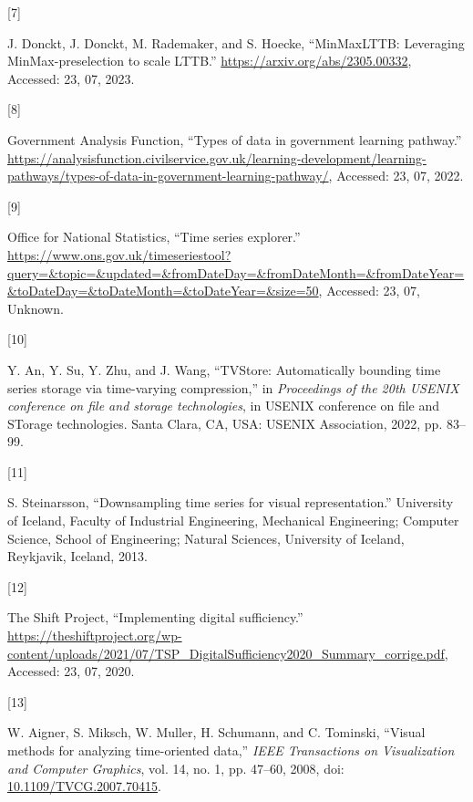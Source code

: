 \documentclass{article}
\newlength{\cslhangindent}
\newlength{\csllabelwidth}
\newlength{\cslentryspacingunit} %
\newenvironment{CSLReferences}[2] %
 {%
  \setlength{\parindent}{0pt}
  \ifodd #1
  \let\oldpar\par
  \def\par{\hangindent=\cslhangindent\oldpar}
  \fi
  \setlength{\parskip}{#2\cslentryspacingunit}
 }%
 {}
\newcommand{\CSLLeftMargin}[1]{\parbox[t]{\csllabelwidth}{#1}}
\newcommand{\CSLRightInline}[1]{\parbox[t]{\linewidth - \csllabelwidth}{#1}\break}
\begin{document}
\begin{CSLReferences}{0}{0}
\leavevmode{}%
\CSLLeftMargin{{[}7{]} }
\CSLRightInline{J. Donckt, J. Donckt, M. Rademaker, and S. Hoecke,
{``MinMaxLTTB: Leveraging MinMax-preselection to scale LTTB.''}
\url{https://arxiv.org/abs/2305.00332}, Accessed: 23, 07, 2023.}

\leavevmode{}%
\CSLLeftMargin{{[}8{]} }
\CSLRightInline{Government Analysis Function, {``Types of data in
government learning pathway.''}
\url{https://analysisfunction.civilservice.gov.uk/learning-development/learning-pathways/types-of-data-in-government-learning-pathway/},
Accessed: 23, 07, 2022.}

\leavevmode{}%
\CSLLeftMargin{{[}9{]} }
\CSLRightInline{Office for National Statistics, {``Time series
explorer.''}
\url{https://www.ons.gov.uk/timeseriestool?query=\&topic=\&updated=\&fromDateDay=\&fromDateMonth=\&fromDateYear=\&toDateDay=\&toDateMonth=\&toDateYear=\&size=50},
Accessed: 23, 07, Unknown.}

\leavevmode{}%
\CSLLeftMargin{{[}10{]} }
\CSLRightInline{Y. An, Y. Su, Y. Zhu, and J. Wang, {``TVStore:
Automatically bounding time series storage via time-varying
compression,''} in \emph{Proceedings of the 20th USENIX conference on
file and storage technologies}, in USENIX conference on file and STorage
technologies. Santa Clara, CA, USA: USENIX Association, 2022, pp.
83--99.}

\leavevmode{}%
\CSLLeftMargin{{[}11{]} }
\CSLRightInline{S. Steinarsson, {``Downsampling time series for visual
representation.''} University of Iceland, Faculty of Industrial
Engineering, Mechanical Engineering; Computer Science, School of
Engineering; Natural Sciences, University of Iceland, Reykjavik,
Iceland, 2013.}

\leavevmode{}%
\CSLLeftMargin{{[}12{]} }
\CSLRightInline{The Shift Project, {``Implementing digital
sufficiency.''}
\url{https://theshiftproject.org/wp-content/uploads/2021/07/TSP_DigitalSufficiency2020_Summary_corrige.pdf},
Accessed: 23, 07, 2020.}

\leavevmode{}%
\CSLLeftMargin{{[}13{]} }
\CSLRightInline{W. Aigner, S. Miksch, W. Muller, H. Schumann, and C.
Tominski, {``Visual methods for analyzing time-oriented data,''}
\emph{IEEE Transactions on Visualization and Computer Graphics}, vol.
14, no. 1, pp. 47--60, 2008, doi:
\href{https://doi.org/10.1109/TVCG.2007.70415}{10.1109/TVCG.2007.70415}.}


\end{CSLReferences}
\end{document}
